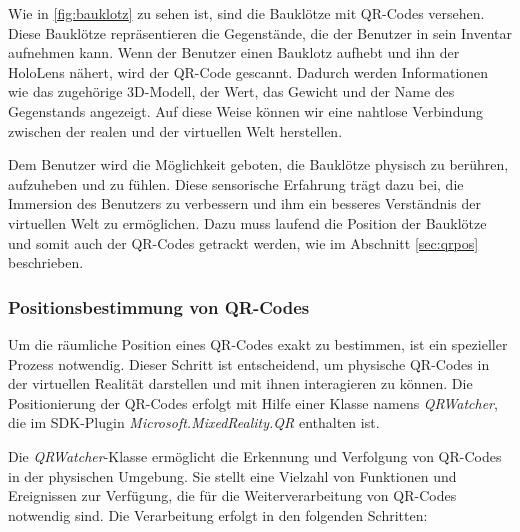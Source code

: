 \begin{itemize}
Wie in \ref{fig:bauklotz} zu sehen ist, sind die Bauklötze mit QR-Codes versehen. Diese Bauklötze repräsentieren die Gegenstände,
die der Benutzer in sein Inventar aufnehmen kann. Wenn der Benutzer einen Bauklotz aufhebt und ihn der HoloLens nähert, wird
der QR-Code gescannt. Dadurch werden Informationen wie das zugehörige 3D-Modell, der Wert, das Gewicht und der Name des
Gegenstands angezeigt. Auf diese Weise können wir eine nahtlose Verbindung zwischen der realen und der virtuellen Welt
herstellen.

Dem Benutzer wird die Möglichkeit geboten, die Bauklötze physisch zu berühren, aufzuheben und zu fühlen. Diese sensorische
Erfahrung trägt dazu bei, die Immersion des Benutzers zu verbessern und ihm ein besseres Verständnis der virtuellen Welt
zu ermöglichen. Dazu muss laufend die Position der Bauklötze und somit auch der QR-Codes getrackt werden, wie im Abschnitt
\ref{sec:qrpos} beschrieben.



\subsubsection{\label{sec:qrpos}Positionsbestimmung von QR-Codes}
Um die räumliche Position eines QR-Codes exakt zu bestimmen, ist ein spezieller Prozess notwendig. Dieser Schritt ist entscheidend, um physische QR-Codes in der virtuellen Realität darstellen und mit ihnen interagieren zu können. Die Positionierung der QR-Codes erfolgt mit Hilfe einer Klasse namens \textit{QRWatcher}, die im SDK-Plugin \textit{Microsoft.MixedReality.QR} enthalten ist.

Die \textit{QRWatcher}-Klasse ermöglicht die Erkennung und Verfolgung von QR-Codes in der physischen Umgebung. Sie stellt eine Vielzahl von Funktionen und Ereignissen zur Verfügung, die für die Weiterverarbeitung von QR-Codes notwendig sind. Die Verarbeitung erfolgt in den folgenden Schritten:


\end{itemize}
